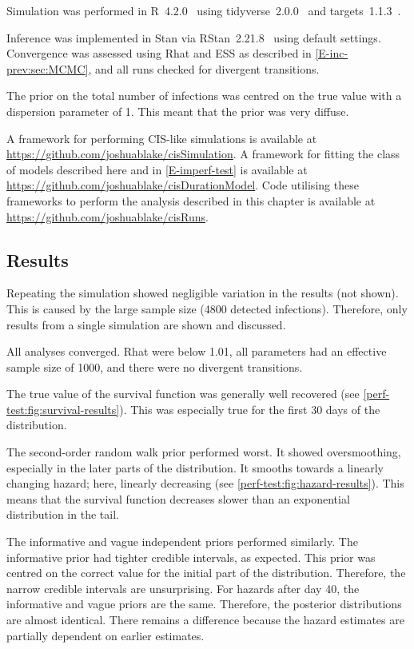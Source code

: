 \documentclass[thesis.tex]{subfiles}
\begin{document}
Simulation was performed in R~4.2.0~\autocite{R-4-2-0} using tidyverse~2.0.0~\autocite{tidyverse} and targets~1.1.3~\autocite{targetsPackage}.

Inference was implemented in Stan via RStan~2.21.8~\autocite{rstan2-21-8} using default settings.
Convergence was assessed using Rhat and ESS as described in \cref{E-inc-prev:sec:MCMC}, and all runs checked for divergent transitions.

The prior on the total number of infections was centred on the true value with a dispersion parameter of 1.
This meant that the prior was very diffuse.

A framework for performing CIS-like simulations is available at \url{https://github.com/joshuablake/cisSimulation}.
A framework for fitting the class of models described here and in \cref{E-imperf-test} is available at \url{https://github.com/joshuablake/cisDurationModel}.
Code utilising these frameworks to perform the analysis described in this chapter is available at \url{https://github.com/joshuablake/cisRuns}.

\subsection{Results} \label{perf-test:sec:results}

Repeating the simulation showed negligible variation in the results (not shown).
This is caused by the large sample size (4800 detected infections).
Therefore, only results from a single simulation are shown and discussed.

All analyses converged.
Rhat were below 1.01, all parameters had an effective sample size of 1000, and there were no divergent transitions.

The true value of the survival function was generally well recovered (see \cref{perf-test:fig:survival-results}).
This was especially true for the first 30 days of the distribution.

The second-order random walk prior performed worst.
It showed oversmoothing, especially in the later parts of the distribution.
It smooths towards a linearly changing hazard; here, linearly decreasing (see \cref{perf-test:fig:hazard-results}).
This means that the survival function decreases slower than an exponential distribution in the tail.

The informative and vague independent priors performed similarly.
The informative prior had tighter credible intervals, as expected.
This prior was centred on the correct value for the initial part of the distribution.
Therefore, the narrow credible intervals are unsurprising.
For hazards after day 40, the informative and vague priors are the same.
Therefore, the posterior distributions are almost identical.
There remains a difference because the hazard estimates are partially dependent on earlier estimates.
\end{document}
